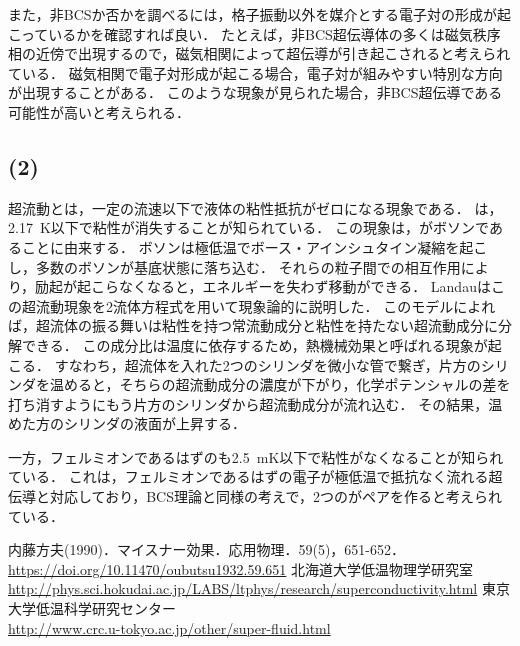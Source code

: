 \documentclass[a4paper,11pt]{jsarticle}
\begin{document}
また，非BCSか否かを調べるには，格子振動以外を媒介とする電子対の形成が起こっているかを確認すれば良い．
たとえば，非BCS超伝導体の多くは磁気秩序相の近傍で出現するので，磁気相関によって超伝導が引き起こされると考えられている\cite{nonbcs}．
磁気相関で電子対形成が起こる場合，電子対が組みやすい特別な方向が出現することがある．
このような現象が見られた場合，非BCS超伝導である可能性が高いと考えられる．


\subsection*{(2)}

超流動とは，一定の流速以下で液体の粘性抵抗がゼロになる現象である．
は，\SI{2.17}{K}以下で粘性が消失することが知られている．
この現象は，がボソンであることに由来する．
ボソンは極低温でボース・アインシュタイン凝縮を起こし，多数のボソンが基底状態に落ち込む．
それらの粒子間での相互作用により，励起が起こらなくなると，エネルギーを失わず移動ができる．
Landauはこの超流動現象を2流体方程式を用いて現象論的に説明した．
このモデルによれば，超流体の振る舞いは粘性を持つ常流動成分と粘性を持たない超流動成分に分解できる．
この成分比は温度に依存するため，熱機械効果と呼ばれる現象が起こる．
すなわち，超流体を入れた2つのシリンダを微小な管で繋ぎ，片方のシリンダを温めると，そちらの超流動成分の濃度が下がり，化学ポテンシャルの差を打ち消すようにもう片方のシリンダから超流動成分が流れ込む．
その結果，温めた方のシリンダの液面が上昇する．

一方，フェルミオンであるはずのも\SI{2.5}{mK}以下で粘性がなくなることが知られている．
これは，フェルミオンであるはずの電子が極低温で抵抗なく流れる超伝導と対応しており，BCS理論と同様の考えで，2つのがペアを作ると考えられている．

\begin{thebibliography}{99}
   内藤方夫(1990)．マイスナー効果．応用物理．59(5)，651-652．\\
  \url{https://doi.org/10.11470/oubutsu1932.59.651}
   北海道大学低温物理学研究室\\
  \url{http://phys.sci.hokudai.ac.jp/LABS/ltphys/research/superconductivity.html}
   東京大学低温科学研究センター\\
  \url{http://www.crc.u-tokyo.ac.jp/other/super-fluid.html}
\end{thebibliography}
\end{document}
